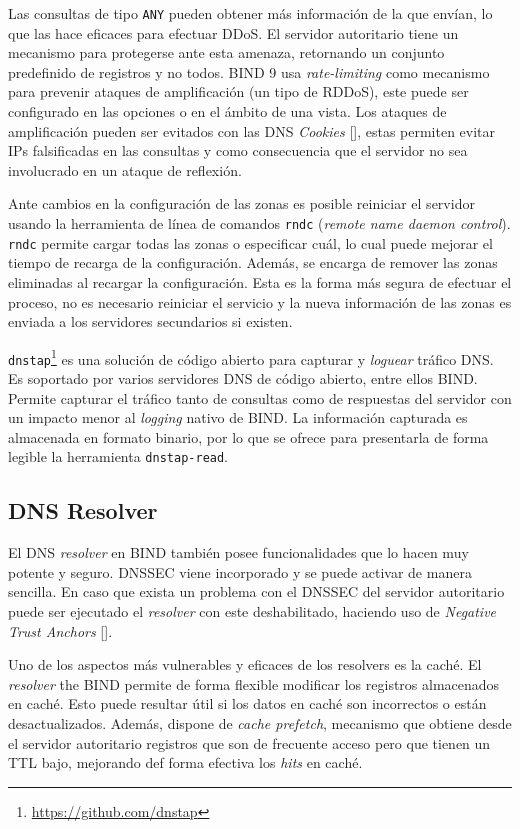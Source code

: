Las consultas de tipo \verb+ANY+ pueden obtener más información de la que envían, lo que las hace eficaces para efectuar DDoS. El servidor autoritario tiene un mecanismo para protegerse ante esta amenaza, retornando un conjunto predefinido de registros y no todos. BIND 9 usa \textit{rate-limiting} como mecanismo para prevenir ataques de amplificación (un tipo de RDDoS), este puede ser configurado en las opciones o en el ámbito de una vista. Los ataques de amplificación pueden ser evitados con las DNS \textit{Cookies} [\cite{rfc_7873}], estas permiten evitar IPs falsificadas en las consultas y como consecuencia que el servidor no sea involucrado en un ataque de reflexión.

Ante cambios en la configuración de las zonas es posible reiniciar el servidor usando la herramienta de línea de comandos \verb+rndc+ (\textit{remote name daemon control}). \verb+rndc+ permite cargar todas las zonas o especificar cuál, lo cual puede mejorar el tiempo de recarga de la configuración. Además, se encarga de remover las zonas eliminadas al recargar la configuración. Esta es la forma más segura de efectuar el proceso, no es necesario reiniciar el servicio y la nueva información de las zonas es enviada a los servidores secundarios si existen.

\verb+dnstap+\footnote{\url{https://github.com/dnstap}} es una solución de código abierto para capturar y \textit{loguear} tráfico DNS. Es soportado por varios servidores DNS de código abierto, entre ellos BIND. Permite capturar el tráfico tanto de consultas como de respuestas del servidor con un impacto menor al \textit{logging} nativo de BIND. La información capturada es almacenada en formato binario, por lo que se ofrece para presentarla de forma legible la herramienta \verb+dnstap-read+. 

\subsection{DNS Resolver}

El DNS \textit{resolver} en BIND también posee funcionalidades que lo hacen muy potente y seguro. DNSSEC viene incorporado y se puede activar de manera sencilla. En caso que exista un problema con el DNSSEC del servidor autoritario puede ser ejecutado el \textit{resolver} con este deshabilitado, haciendo uso de \textit{Negative Trust Anchors} [\cite{rfc_7646}].

Uno de los aspectos más vulnerables y eficaces de los resolvers es la caché. El \textit{resolver} the BIND permite de forma flexible modificar los registros almacenados en caché. Esto puede resultar útil si los datos en caché son incorrectos o están desactualizados. Además, dispone de \textit{cache prefetch}, mecanismo que obtiene desde el servidor autoritario registros que son de frecuente acceso pero que tienen un TTL bajo, mejorando def forma efectiva los \textit{hits} en caché.


